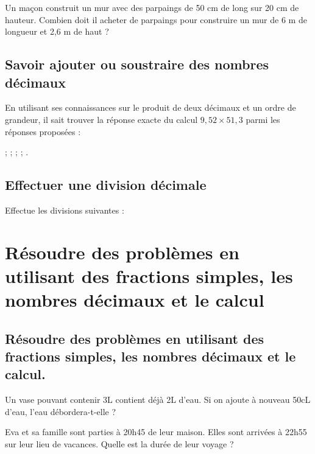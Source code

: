 Un maçon construit un mur avec des parpaings de 50 cm de long sur 20 cm de hauteur. Combien doit il acheter de parpaings pour construire un mur de 6 m de longueur et 2,6 m de haut ?



\subsection{Savoir ajouter ou soustraire des nombres décimaux}



En utilisant ses connaissances sur le produit de deux décimaux et un ordre de grandeur, il sait 
trouver la réponse exacte du calcul $9,52 \times 51,3$ parmi les réponses proposées :

 ;  ;  ;  ; .



\subsection{Effectuer une division décimale}



 



Effectue les divisions suivantes :
 






\section{Résoudre des problèmes en utilisant des fractions simples, les nombres décimaux et le calcul}

\subsection{Résoudre des problèmes en utilisant des fractions simples, les nombres décimaux et le calcul.}


Un vase pouvant contenir 3L contient déjà 2L d'eau. Si on ajoute à nouveau 50cL d'eau, l'eau débordera-t-elle ?




Eva et sa famille sont parties à 20h45 de leur maison. Elles sont arrivées à 22h55 sur leur lieu de vacances. Quelle est la durée de leur voyage ?


